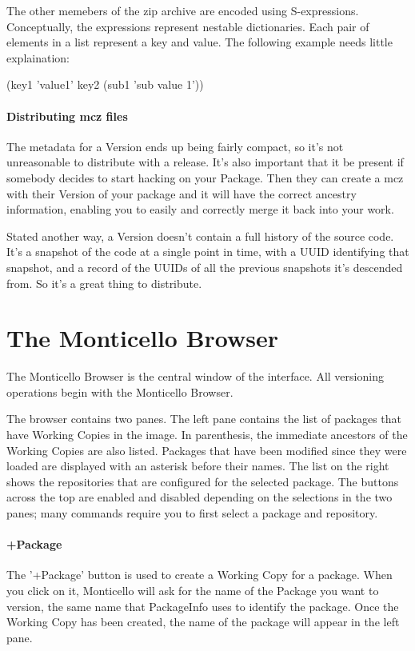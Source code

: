 \documentclass[a4paper,10pt,twoside]{book}
\begin{document}
The other memebers of the zip archive are encoded using S-expressions. Conceptually, the expressions represent nestable dictionaries. Each pair of elements in a list represent a key and value. The following example needs little explaination:

(key1 'value1' key2 (sub1 'sub value 1'))

\paragraph{Distributing mcz files}

The metadata for a Version ends up being fairly compact, so it's not unreasonable to distribute with a release. It's also important that it be present if somebody decides to start hacking on your Package. Then they can create a mcz with their Version of your package and it will have the correct ancestry information, enabling you to easily and correctly merge it back into your work.

Stated another way, a Version doesn't contain a full history of the source code. It's a snapshot of the code at a single point in time, with a UUID identifying that snapshot, and a record of the UUIDs of all the previous snapshots it's descended from. So it's a great thing to distribute.

\section{The Monticello Browser}

The Monticello Browser is the central window of the interface. All versioning operations begin with the Monticello Browser.

The browser contains two panes. The left pane contains the list of packages that have Working Copies in the image. In parenthesis, the immediate ancestors of the Working Copies are also listed. Packages that have been modified since they were loaded are displayed with an asterisk before their names. The list on the right shows the repositories that are configured for the selected package. The buttons across the top are enabled and disabled depending on the selections in the two panes; many commands require you to first select a package and repository.

\paragraph{+Package}

The '+Package' button is used to create a Working Copy for a package. When you click on it, Monticello will ask for the name of the Package you want to version, the same name that PackageInfo uses to identify the package. Once the Working Copy has been created, the name of the package will appear in the left pane.
\end{document}
